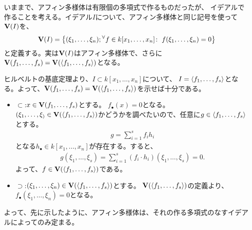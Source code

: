 \documentclass[9pt]{ltjsarticle}
\begin{document}
いままで、アフィン多様体は有限個の多項式で作るものだったが、
イデアルで作ることを考える。イデアル$I$について、アフィン多様体と同じ記号を使って$\textbf V(I)$を、
\begin{align}
  \textbf V(I) = \left\{(\xi_1,\dots,\xi_n); {}^{\forall}{f\in k[x_1,\dots,x_n]}\mathrm{\colon\;} f(\xi_1,\dots,\xi_n) = 0\right\}
\end{align}
と定義する。実は$\textbf V(I)$はアフィン多様体で、さらに$\textbf V(f_1,\dots,f_s) = \textbf V(\left\langle f_1,\dots,f_s \right\rangle)$となる。
\begin{myproof}
ヒルベルトの基底定理より、$I\subset k[x_1,\dots,x_n]$について、
$I=\left\langle f_1,\dots,f_s \right\rangle$となる。よって、$\textbf V(f_1,\dots,f_s) = \textbf V(\left\langle f_1,\dots,f_s \right\rangle)$を示せば十分である。
\begin{itemize}
  \item $\subset$:$x\in \textbf V(f_1,\dots,f_s)$とする。
  $f_\bullet(x) = 0$となる。$(\xi_1,\dots,\xi_)\in \textbf V(\left\langle f_1,\dots,f_s \right\rangle)$かどうかを調べたいので、任意に$g\in \left\langle f_1,\dots,f_s \right\rangle$とする。
  \begin{align}
    g = \sum_{i=1}^s f_i h_i
  \end{align}
  となる$h_\bullet \in k[x_1,\dots,x_n]$が存在する。すると、
  \begin{align}
    g(\xi_1,\dots,\xi_s) = \sum_{i=1}^s (f_i \cdot h_i)(\xi_1,\dots,\xi_s) = 0.
  \end{align}
  よって、$f\in \textbf V(\left\langle f_1,\dots,f_s \right\rangle)$である。
  \item $\supset$:$(\xi_1,\dots,\xi_n) \in \textbf V(\left\langle f_1,\dots,f_s \right\rangle)$とする。
  $\textbf V(\left\langle f_1,\dots,f_s \right\rangle)$の定義より、
  $f_\bullet(\xi_1,\dots,\xi_n) = 0$となる。
\end{itemize}
\end{myproof}
よって、先に示したように、アフィン多様体は、それの作る多項式のなすイデアルによってのみ定まる。
\end{document}
